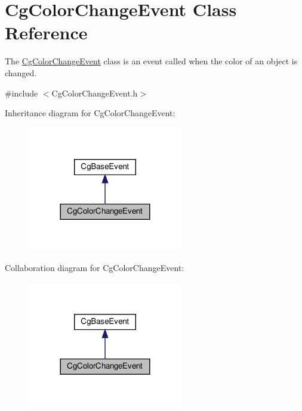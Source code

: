 \hypertarget{class_cg_color_change_event}{}\section{Cg\+Color\+Change\+Event Class Reference}
\label{class_cg_color_change_event}


The \hyperlink{class_cg_color_change_event}{Cg\+Color\+Change\+Event} class is an event called when the color of an object is changed.  




{\ttfamily \#include $<$Cg\+Color\+Change\+Event.\+h$>$}



Inheritance diagram for Cg\+Color\+Change\+Event\+:
\nopagebreak
\begin{figure}[H]
\begin{center}
\leavevmode
\includegraphics[width=192pt]{class_cg_color_change_event__inherit__graph}
\end{center}
\end{figure}


Collaboration diagram for Cg\+Color\+Change\+Event\+:
\nopagebreak
\begin{figure}[H]
\begin{center}
\leavevmode
\includegraphics[width=192pt]{class_cg_color_change_event__coll__graph}
\end{center}
\end{figure}
